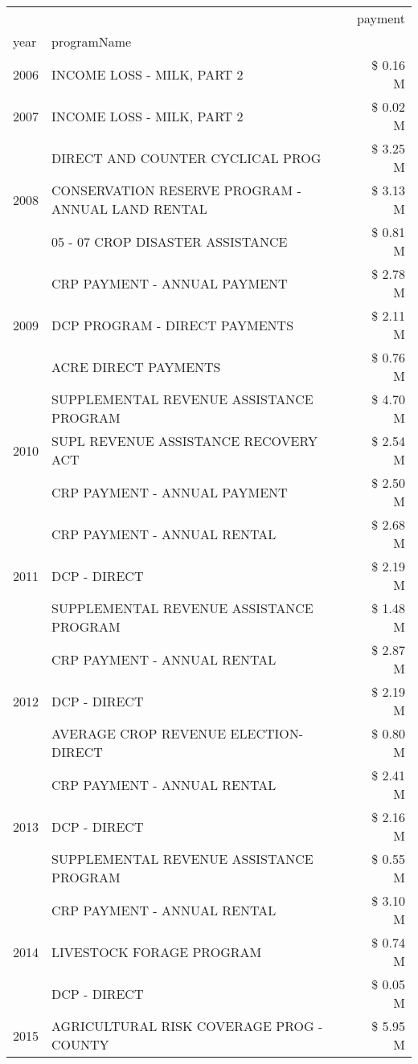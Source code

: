 \begin{tabular}{llr}
\toprule
 &  & payment \\
year & programName &  \\
\midrule
2006 & INCOME LOSS - MILK, PART 2 & \$ 0.16 M \\
\cline{1-3}
2007 & INCOME LOSS - MILK, PART 2 & \$ 0.02 M \\
\cline{1-3}
\multirow[t]{3}{*}{2008} & DIRECT AND COUNTER CYCLICAL PROG & \$ 3.25 M \\
 & CONSERVATION RESERVE PROGRAM - ANNUAL LAND RENTAL & \$ 3.13 M \\
 & 05 - 07 CROP DISASTER ASSISTANCE & \$ 0.81 M \\
\cline{1-3}
\multirow[t]{3}{*}{2009} & CRP PAYMENT - ANNUAL PAYMENT & \$ 2.78 M \\
 & DCP PROGRAM - DIRECT PAYMENTS & \$ 2.11 M \\
 & ACRE DIRECT PAYMENTS & \$ 0.76 M \\
\cline{1-3}
\multirow[t]{3}{*}{2010} & SUPPLEMENTAL REVENUE ASSISTANCE PROGRAM & \$ 4.70 M \\
 & SUPL REVENUE ASSISTANCE RECOVERY ACT & \$ 2.54 M \\
 & CRP PAYMENT - ANNUAL PAYMENT & \$ 2.50 M \\
\cline{1-3}
\multirow[t]{3}{*}{2011} & CRP PAYMENT - ANNUAL RENTAL & \$ 2.68 M \\
 & DCP - DIRECT & \$ 2.19 M \\
 & SUPPLEMENTAL REVENUE ASSISTANCE PROGRAM & \$ 1.48 M \\
\cline{1-3}
\multirow[t]{3}{*}{2012} & CRP PAYMENT - ANNUAL RENTAL & \$ 2.87 M \\
 & DCP - DIRECT & \$ 2.19 M \\
 & AVERAGE CROP REVENUE ELECTION-DIRECT & \$ 0.80 M \\
\cline{1-3}
\multirow[t]{3}{*}{2013} & CRP PAYMENT - ANNUAL RENTAL & \$ 2.41 M \\
 & DCP - DIRECT & \$ 2.16 M \\
 & SUPPLEMENTAL REVENUE ASSISTANCE PROGRAM & \$ 0.55 M \\
\cline{1-3}
\multirow[t]{3}{*}{2014} & CRP PAYMENT - ANNUAL RENTAL & \$ 3.10 M \\
 & LIVESTOCK FORAGE PROGRAM & \$ 0.74 M \\
 & DCP - DIRECT & \$ 0.05 M \\
\cline{1-3}
\multirow[t]{3}{*}{2015} & AGRICULTURAL RISK COVERAGE PROG - COUNTY & \$ 5.95 M \\

\end{tabular}
